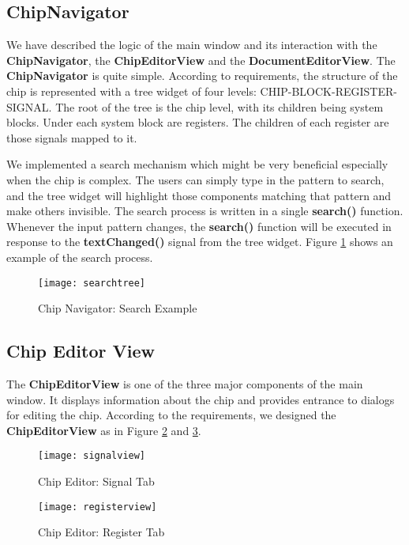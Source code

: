 \subsection{ChipNavigator}
We have described the logic of the main window and its interaction with the \textbf{ChipNavigator}, the \textbf{ChipEditorView} and the \textbf{DocumentEditorView}. The \textbf{ChipNavigator} is quite simple. According to requirements, the structure of the chip is represented with a tree widget of four levels: CHIP-BLOCK-REGISTER-SIGNAL. The root of the tree is the chip level, with its children being system blocks. Under each system block are registers. The children of each register are those signals mapped to it.

We implemented a search mechanism which might be very beneficial especially when the chip is complex. The users can simply type in the pattern to search, and the tree widget will highlight those components matching that pattern and make others invisible. The search process is written in a single \textbf{search()} function. Whenever the input pattern changes, the \textbf{search()} function will be executed in response to the \textbf{textChanged()} signal from the tree widget. Figure \ref{fig:Chip Navigator: Search Example} shows an example of the search process.

\begin{figure}[htb]
\centering
\texttt{[image: searchtree]}
\caption{Chip Navigator: Search Example\label{fig:Chip Navigator: Search Example}}
\end{figure}

\subsection{Chip Editor View}
The \textbf{ChipEditorView} is one of the three major components of the main window. It displays information about the chip and provides entrance to dialogs for editing the chip. According to the requirements, we designed the \textbf{ChipEditorView} as in Figure \ref{fig:Chip Editor: Signal Tab} and \ref{fig:Chip Editor: Register Tab}.

\begin{figure}[htbp]
\centering
\texttt{[image: signalview]}
\caption{Chip Editor: Signal Tab\label{fig:Chip Editor: Signal Tab}}
\end{figure}

\begin{figure}[htbp]
\centering
\texttt{[image: registerview]}
\caption{Chip Editor: Register Tab\label{fig:Chip Editor: Register Tab}}
\end{figure}

